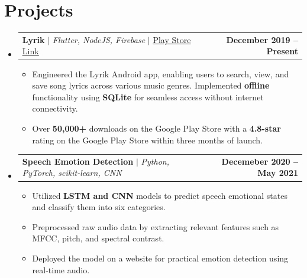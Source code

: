 \documentclass[letterpaper,11pt]{article}
\makeatletter
\newcommand{\resumeItem}[1]{
  \item\small{
    {#1 \vspace{-2pt}}
  }
}
\newcommand{\resumeProjectHeading}[2]{
    \item
    \begin{tabular*}{0.97\textwidth}{l@{\extracolsep{\fill}}r}
        \small#1 & \textbf{#2} \\
    \end{tabular*}\vspace{-7pt}
}
\newcommand{\resumeSubHeadingListStart}{\begin{itemize}[leftmargin=0.15in, label={}]}
\newcommand{\resumeSubHeadingListEnd}{\end{itemize}}
\newcommand{\resumeItemListStart}{\begin{itemize}}
\newcommand{\resumeItemListEnd}{\end{itemize}\vspace{-5pt}}
\makeatother
\begin{document}
\section{Projects}
    \resumeSubHeadingListStart
    \resumeProjectHeading
    {\textbf{Lyrik} $|$ \emph{Flutter, NodeJS, Firebase} $|$ 
   \href{https://play.google.com/store/apps/details?id=com.buildjuice.lyriks\&hl=en\_US}{\underline{Play Store Link}}}
  {December 2019 -- Present}
          \resumeItemListStart
          \resumeItem{Engineered the Lyrik Android app, enabling users to search, view, and save song lyrics across various music genres. Implemented \textbf{offline} functionality using \textbf{SQLite} for seamless access without internet connectivity.}
            \resumeItem{
                Over \textbf{50,000+} downloads on the Google Play Store with a \textbf{4.8-star} rating on the Google Play Store within three months of launch.	
}
          \resumeItemListEnd
      \resumeProjectHeading
          {\textbf{Speech Emotion Detection} $|$ \emph{Python, PyTorch, scikit-learn, CNN}}{Decemeber 2020 -- May 2021}
          \resumeItemListStart
          \resumeItem{Utilized \textbf{LSTM and CNN} models to predict speech emotional states and classify them into six categories.}
            \resumeItem{Preprocessed raw audio data by extracting relevant features such as MFCC, pitch, and spectral contrast.}
            \resumeItem{Deployed the model on a website for practical emotion detection using real-time audio.}
          \resumeItemListEnd
    \resumeSubHeadingListEnd






\end{document}
